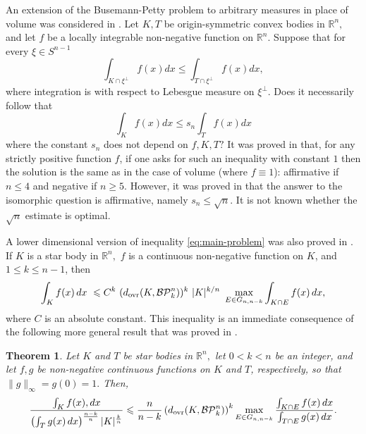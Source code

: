 \documentclass[11pt,leqno]{article}
\newtheorem{theorem}{Theorem}[section]
\theoremstyle{definition}
\theoremstyle{remark}
\numberwithin{equation}{section}
\newcommand{\ls}{\leqslant}
\newcommand{\gr}{\geqslant}
\newcommand{\1}{\textbf{1}}
\newcommand{\R}{\mathbb{R}}
\begin{document}
An extension of the Busemann-Petty problem to arbitrary measures in place of volume was considered in \cite{Zvavitch-2005}.
Let $K,T$ be origin-symmetric convex bodies in $\R^n,$ and let $f$ be a locally integrable non-negative function on $\R^n.$
Suppose that for every $\xi\in S^{n-1}$
\begin{equation}\label{eq:1.12}\int_{K\cap \xi^\bot} f(x) dx \ls \int_{T\cap \xi^\bot} f(x) dx,\end{equation}
where integration is with respect to Lebesgue measure on $\xi^\bot.$
Does it necessarily follow that
\begin{equation}\label{eq:main-problem}\int_K f(x) dx \ls s_n\int_T f(x) dx\end{equation}
where the constant $s_n$ does not depend on $f,K,T?$ It was proved in \cite{Zvavitch-2005} that, for any strictly positive function $f$, if one asks for such an inequality with constant $1$ then the solution is the same as in the case of volume (where $f\equiv 1$): affirmative if $n\ls 4$ and negative if $n\gr 5$. However, it was proved in \cite{Koldobsky-Zvavitch-2015} that the answer to the isomorphic question is affirmative, namely $s_n\ls \sqrt{n}.$ It is not known whether the $\sqrt{n}$ estimate is optimal.

A lower dimensional version of inequality \eqref{eq:main-problem} was also proved in \cite{Koldobsky-AIM-2015}. If $K$ is a star body in $\R^n,$ $f$ is a continuous non-negative function on $K$, and $1\ls k\ls n-1$, then
\begin{equation}\label{eq:main-problem-2}
\int_Kf(x)\,dx\ \ls C^k \ (d_{\rm {ovr}}(K,{\mathcal{BP}}_k^n))^k\  |K|^{k/n}\ \max_{E\in G_{n,n-k}} \int_{K\cap E} f(x)\,dx,
\end{equation}
where $C$ is an absolute constant. This inequality is an immediate consequence of the following
more general result that was proved in \cite{Giannopoulos-Koldobsky-Zvavitch-2022}.

\begin{theorem}\label{th:intro-quotient}Let $K$ and $T$ be star bodies in $\R^n,$ let $0<k<n$ be an integer,
and let $f,g$ be non-negative continuous functions on $K$ and $T$, respectively, so that $\|g\|_\infty=g(0)=1.$
Then,
\begin{equation}\label{eq:1.13}
\frac{\int_Kf(x),dx}{\left(\int_T g(x)\,dx\right)^{\frac{n-k}n}|K|^{\frac kn}}  \ls\frac n{n-k} \left(d_{\rm ovr}(K,{\mathcal{BP}}_k^n)\right)^k
\max_{E\in G_{n,n-k}} \frac{\int_{K\cap E} f(x)\,dx}{\int_{T\cap E} g(x)\,dx}.
\end{equation}
\end{theorem}
\end{document}
